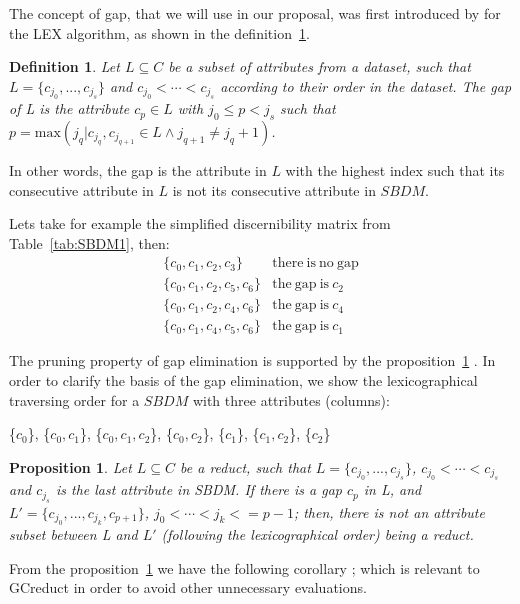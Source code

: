 \documentclass[authoryear,preprint,review,12pt]{elsarticle}
\newtheorem{proposition}{Proposition}
\newtheorem{definition}{Definition}
\begin{document}
	The concept of gap, that we will use in our proposal, was first introduced by \cite{Santiesteban03} for 
	the LEX algorithm, as shown in the definition~\ref{def:gap}.
	
	\begin{definition}\label{def:gap}
		Let $L \subseteq C$ be a subset of attributes from a dataset, such that $L = \lbrace c_{j_0},...,c_{j_s}
		\rbrace$ and $c_{j_0}<\cdots <c_{j_s}$ according to their order in the dataset. The gap of L is the
		attribute $c_p \in L$ with $j_0 \leq p <	j_s$ such that $p=\mathrm{max}(j_q | c_{j_q},c_{j_{q+1}} \in 
		L \wedge j_{q+1} \neq j_q+1)$.
	\end{definition}
	
	In other words, the gap is the attribute in $L$ with the highest index such that its consecutive attribute in 
	$L$ is not its consecutive attribute in $SBDM$.
	
	Lets take for example the simplified discernibility matrix from Table~\ref{tab:SBDM1}, then:
	$$\begin{array}{ll}
	\lbrace c_0,c_1,c_2,c_3\rbrace 		& \mathrm{there~is~no~gap}\\
	\lbrace c_0,c_1,c_2,c_5,c_6\rbrace 	& \mathrm{the~gap~is~} c_2\\
	\lbrace c_0,c_1,c_2,c_4,c_6\rbrace 	& \mathrm{the~gap~is~} c_4\\
	\lbrace c_0,c_1,c_4,c_5,c_6\rbrace 	& \mathrm{the~gap~is~} c_1
	\end{array}$$
	
	
	The pruning property of gap elimination is supported by the proposition~\ref{prop:gap} \citep{Santiesteban03}. In order to clarify	the basis of the gap elimination, we show the lexicographical traversing order for a $SBDM$ with three attributes (columns):
	
	\{$c_0$\}, \{$c_0,c_1$\}, \{$c_0,c_1,c_2$\}, \{$c_0,c_2$\}, \{$c_1$\}, \{$c_1,c_2$\}, \{$c_2$\}
		
	\begin{proposition}\label{prop:gap} 
		Let $L \subseteq C$ be a reduct, such that $L = \lbrace c_{j_0},...,c_{j_s}\rbrace$, $c_{j_0}<\cdots
		<c_{j_s}$ and $c_{j_s}$ is the last attribute in SBDM. If there is a gap $c_p$ in L, and $L' = \lbrace
		c_{j_0},...,c_{j_k},c_{p+1}\rbrace$, $j_0<\cdots <j_k<=p-1$; then, there is not an attribute subset
		between L and $L'$ (following the lexicographical order) being a reduct.
	\end{proposition}	
	
	From the proposition~\ref{prop:gap} we have the following corollary \citep{Santiesteban03}; which is relevant to GCreduct in order to avoid other unnecessary evaluations.
	
\end{document}
